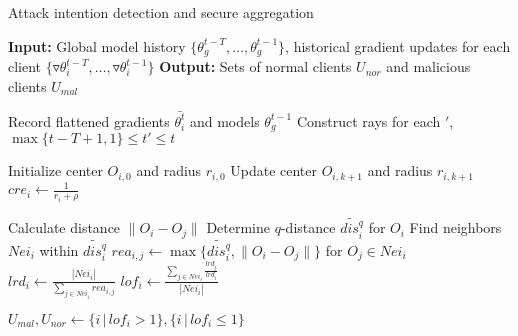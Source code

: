 \documentclass[lettersize,journal]{IEEEtran}
\begin{document}
\begin{algorithm}
\caption{Attack intention detection and secure aggregation}
\label{alg:malicious-node-detection-history}
\begin{algorithmic}[1]
\State \textbf{Input:} Global model history $\{\theta_g^{t-T}, \dots, \theta_g^{t-1}\}$, historical gradient updates for each client $\{\triangledown \theta_{i}^{t-T}, \dots, \triangledown \theta_{i}^{t-1}\}$
\State \textbf{Output:} Sets of normal clients $U_{nor}$ and malicious clients $U_{mal}$



    \State Record flattened gradients $\bar{\theta_i^t}$ and models $\theta_g^{t-1}$
    \State Construct rays for each $'$, $\max\{t-T+1, 1\}\leq t' \leq t$



    \State Initialize center $O_{i,0}$ and radius $r_{i,0}$
        \State Update center $O_{i,k+1}$ and radius $r_{i,k+1}$
    \EndWhile
    \State  $cre_i  \gets \frac{1}{r_i + \rho}$ 



        \State Calculate distance $\|O_i - O_j\|$
    \EndFor
    \State Determine $q$-distance $\widetilde{dis_i^q}$ for $O_i$
    \State Find neighbors $Nei_i$ within $\widetilde{dis_i^q}$
    \State $rea_{i,j}  \gets \max\{\widetilde{dis_i^q}, \|O_i - O_j\|\}$ for $O_j \in Nei_i$  
    \State  $lrd_i  \gets \frac{|Nei_i|}{\sum_{j \in Nei_i} rea_{i,j}}$ 
    \State $lof_i  \gets \frac{\sum_{j \in Nei_i} \frac{lrd_j}{lrd_i}}{|Nei_i|}$

\State $U_{mal}, U_{nor}  \gets \{i \,|\, lof_i > 1\}, \{i \,|\, lof_i \leq 1\}$


\end{algorithmic}
\end{algorithm}
\end{document}
